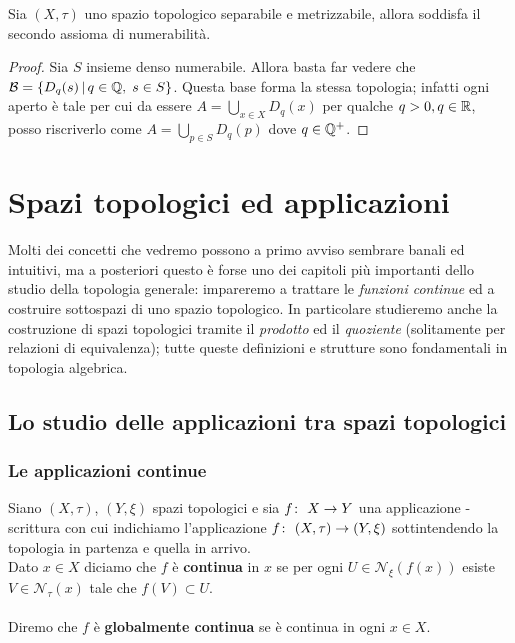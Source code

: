 \begin{theorem}
	Sia $(X, \tau)$ uno spazio topologico separabile e metrizzabile, allora soddisfa il secondo assioma di numerabilità.
\end{theorem}
\begin{proof}
	Sia $S$ insieme denso numerabile. Allora basta far vedere che $\mathcal{B} = \left\{ D_q(s) \,\middle|\, q \in \mathbb{Q}, \; s \in S\right\}$. Questa base forma la stessa topologia; infatti ogni aperto è tale per cui da essere $A = \bigcup_{x \in X} D_q(x)$ per qualche $q > 0, q\in \mathbb{R}$, posso riscriverlo come $A = \bigcup_{p \in S} D_q(p)$ dove $q \in \mathbb{Q}^+$.
\end{proof}



\chapter{Spazi topologici ed applicazioni}
Molti dei concetti che vedremo possono a primo avviso sembrare banali ed intuitivi, ma a posteriori questo è forse uno dei capitoli più importanti dello studio della topologia generale: impareremo a trattare le \textit{funzioni continue} ed a costruire sottospazi di uno spazio topologico. In particolare studieremo anche la costruzione di spazi topologici tramite il \textit{prodotto} ed il \textit{quoziente} (solitamente per relazioni di equivalenza); tutte queste definizioni e strutture sono fondamentali in topologia algebrica. 

\newpage
\section{Lo studio delle applicazioni tra spazi topologici}
\subsection{\textcolor{TopGener}{\textbf{Le applicazioni continue}}}



\begin{definition}
	Siano $(X,\tau)$, $(Y, \xi)$ spazi topologici e sia $f \colon\ X \rightarrow Y$ una applicazione - scrittura con cui indichiamo l'applicazione $f \colon\ (X,\tau) \rightarrow (Y,\xi)$ sottintendendo la topologia in partenza e quella in arrivo. \\ Dato $x \in X$ diciamo che $f$ è \textbf{continua} in $x$ se per ogni $U \in \mathcal{N}_\xi(f(x))$ esiste $V \in \mathcal{N}_\tau(x)$ tale che $f(V) \subset U$. \\ \\Diremo che $f$ è \textbf{globalmente continua} se è continua in ogni $x \in X$.
\end{definition}


